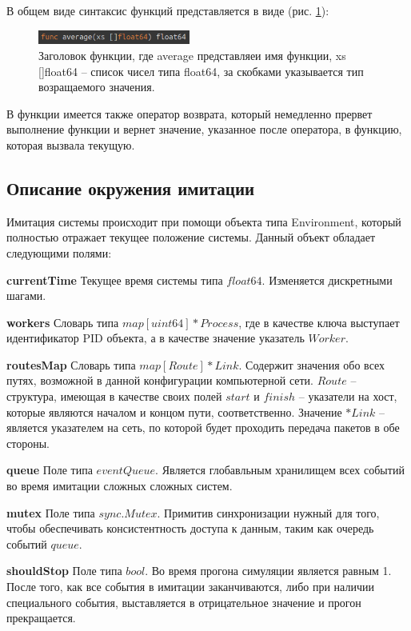 В общем виде синтаксис функций представляется в виде (рис. \ref{fig:func-body}):

\begin{figure}[!ht]
\centering
\includegraphics[width=5cm]{Kenenbek/images/func-body.png}
\caption{Заголовок функции, где average представляеи имя функции, xs []float64 -- список чисел типа float64, за скобками указывается тип возращаемого значения.}
\label{fig:func-body}
\end{figure}

\par 
В функции имеется также оператор возврата, который немедленно прервет выполнение функции и вернет значение, указанное после оператора, в функцию, которая вызвала текущую.


\subsection{Описание окружения имитации}

Имитация системы происходит при помощи объекта типа Environment, который полностью отражает текущее положение системы. Данный объект обладает следующими полями:

\textbf{currentTime}
Текущее время системы типа $float64$. Изменяется дискретными шагами.

\textbf{workers}
Словарь типа $map[uint64]*Process$, где в качестве ключа выступает идентификатор PID объекта, а в качестве значение указатель $Worker$.

\textbf{routesMap}  
Словарь типа  $map[Route]*Link$. Содержит значения обо всех путях, возможной в данной конфигурации компьютерной сети. $Route$ -- структура, имеющая в качестве своих полей $start$ и $finish$ -- указатели на хост, которые являются началом и концом пути, соответственно. Значение $*Link$ -- является указателем на сеть, по которой будет проходить передача пакетов в обе стороны.


\textbf{queue}
Поле типа $eventQueue$. Является глобавльным хранилищем всех событий во время имитации сложных сложных систем.

\textbf{mutex}         
Поле типа $sync.Mutex$. Примитив синхронизации нужный для того, чтобы обеспечивать консистентность доступа к данным, таким как очередь событий $queue$. 

\textbf{shouldStop}    
Поле типа $bool$. Во время прогона симуляции является равным 1. После того, как все события в имитации заканчиваются, либо при наличии специального события, выставляется в отрицательное значение и прогон прекращается.


